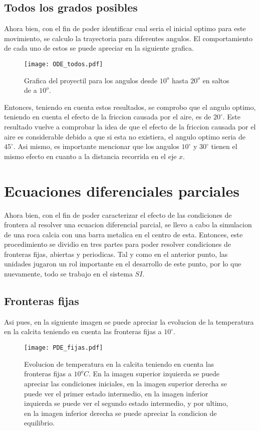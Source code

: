 \documentclass[11pt]{article}
\begin{document}
	\subsection{Todos los grados posibles}
		Ahora bien, con el fin de poder identificar cual seria el inicial optimo para este movimiento, se calculo la trayectoria para diferentes angulos. El comportamiento de cada uno de estos 			se puede apreciar en la siguiente grafica.
		\begin{figure}[H]
    			\centering
    				\texttt{[image: ODE\_todos.pdf]}
    				\caption{Grafica del proyectil para los angulos desde $10^o$ hasta $20^o$ en saltos de a $10^o$.}
    			\label{fig:todos}
		\end{figure}

		Entonces, teniendo en cuenta estos resultados, se comprobo que el angulo optimo, teniendo en cuenta el efecto de la friccion causada por el aire, es de $20^\circ$. Este resultado vuelve 			a comprobar la idea de que el efecto de la friccion causada por el aire es considerable debido a que si esta no existiera, el angulo optimo seria de $45^\circ$. Asi mismo, es importante 			mencionar que los angulos $10^\circ$ y $30^\circ$ tienen el mismo efecto en cuanto a la distancia recorrida en el eje $x$.


\section{Ecuaciones diferenciales parciales}

Ahora bien, con el fin de poder caracterizar el efecto de las condiciones de frontera al resolver una ecuacion diferencial parcial, se llevo a cabo la simulacion de una roca calcia con una barra metalica en el centro de esta. Entonces, este procedimiento se dividio en tres partes para poder resolver condiciones de fronteras fijas, abiertas y periodicas. Tal y como en el anterior punto, las unidades jugaron un rol importante en el desarrollo de este punto, por lo que nuevamente, todo se trabajo en el sistema $SI$.
	\subsection{Fronteras fijas}

		Asi pues, en la siguiente imagen se puede apreciar la evolucion de la temperatura en la calcita teniendo en cuenta las fronteras fijas a $10^\circ$. 
		\begin{figure}[H]
    			\centering
    				\texttt{[image: PDE\_fijas.pdf]}
    				\caption{Evolucion de temperatura en la calcita teniendo en cuenta las fronteras fijas a $10^o C$. En la imagen superior izquierda se puede apreciar las condiciones 						iniciales, en la imagen superior derecha se puede ver el primer estado intermedio, en la imagen inferior izquierda se puede ver el segundo estado intermedio, y 					por ultimo, en la imagen inferior derecha se puede apreciar la condicion de equilibrio.}
    			\label{fig:fijas}
		\end{figure}
\end{document}
